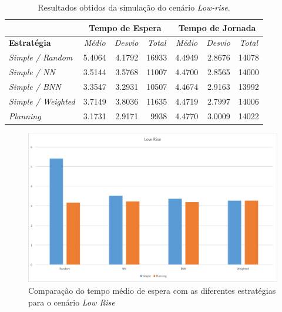 \begin{table}[htb!]
\centering
\caption{Resultados obtidos da simulação do cenário \textit{Low-rise}.}
\label{tab:results:lowrise}
\begin{tabular}{|l|r|r|r|r|r|r|}
\hline
\multicolumn{1}{|c|}{\textbf{}}                 & \multicolumn{3}{c|}{\textbf{Tempo de Espera}}                                                                    & \multicolumn{3}{c|}{\textbf{Tempo de Jornada}}                                                                                                                       \\ \hline
\textbf{Estratégia} & \multicolumn{1}{c|}{\textit{Médio}} & \multicolumn{1}{c|}{\textit{Desvio}} & \multicolumn{1}{c|}{\textit{Total}} & \multicolumn{1}{c|}{\textit{Médio}}                   & \multicolumn{1}{c|}{\textit{Desvio}}                  & \multicolumn{1}{c|}{\textit{Total}}                  \\ \hline
\textit{Simple / Random}          & 5.4064 & 4.1792 & 16933 & 4.4949 & 2.8676 & 14078 \\ \hline
\textit{Simple / NN}              & 3.5144 & 3.5768 & 11007 & 4.4700 & 2.8565 & 14000 \\ \hline
\textit{Simple / BNN}             & 3.3547 & 3.2931 & 10507 & \cellcolor[HTML]{67FD9A}4.4674 & 2.9163 & \cellcolor[HTML]{67FD9A}13992 \\ \hline
\textit{Simple / Weighted}        & 3.7149 & 3.8036 & 11635 & 4.4719 & \cellcolor[HTML]{67FD9A}2.7997 & 14006 \\ \hline
\textit{Planning}                 & \cellcolor[HTML]{67FD9A}3.1731 & \cellcolor[HTML]{67FD9A}2.9171 &  \cellcolor[HTML]{67FD9A}9938 & 4.4770 & 3.0009 & 14022 \\ \hline
\end{tabular}
\end{table}

\begin{figure}[htb]
  \centering
  \includegraphics[scale=0.5]{img/chart-averages-low-rise}
  \caption{Comparação do tempo médio de espera com as diferentes estratégias
    para o cenário \textit{Low Rise}}
  \label{fig:result:average:low-rise}
\end{figure}

